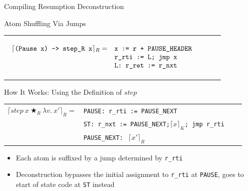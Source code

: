 \documentclass{beamer}
\begin{document}
\begin{frame}{Compiling Resumption Deconstruction}

\begin{structure}{Atom Shuffling Via Jumps}
\begin{onlinebox}{9cm}
\begin{tabular}[t]{llll}

\begin{scriptsize}
$
\begin{array}[t]{llll}

\lceil \texttt{(Pause x) -> step\_R\ x}\rceil_R =& \texttt{x := r + PAUSE\_HEADER}\\
&\texttt{r\_rti := L; jmp x}\\
&\texttt{L: r\_ret := r\_nxt}

\end{array}
$
\end{scriptsize}
\end{tabular}
\end{onlinebox}
\end{structure}

\bigskip

\begin{structure}{How It Works: Using the Definition of $step$}

\begin{onlinebox}{10cm}
\begin{flushleft}

\begin{scriptsize}
\begin{tabular}[t]{llll}

$\lceil step\ x\ \bigstar_R\ \lambda v.\ x\prime \rceil_R =$&\texttt{PAUSE: r\_rti := PAUSE\_NEXT}\\
&\texttt{ST: r\_nxt := PAUSE\_NEXT;}$\lceil x \rceil_K$\texttt{; jmp r\_rti}\\
&\texttt{PAUSE\_NEXT: }$\ \lceil x\prime \rceil_R$\\


\end{tabular}
\end{scriptsize}

\end{flushleft}
\end{onlinebox}

\begin{itemize}

\item{Each atom is suffixed by a jump determined by \texttt{r\_rti}}
\item{Deconstruction bypasses the initial assignment to \texttt{r\_rti} at \texttt{PAUSE}, goes to start of state code at \texttt{ST} instead}


\end{itemize}
\end{structure}
\end{frame}
\end{document}
